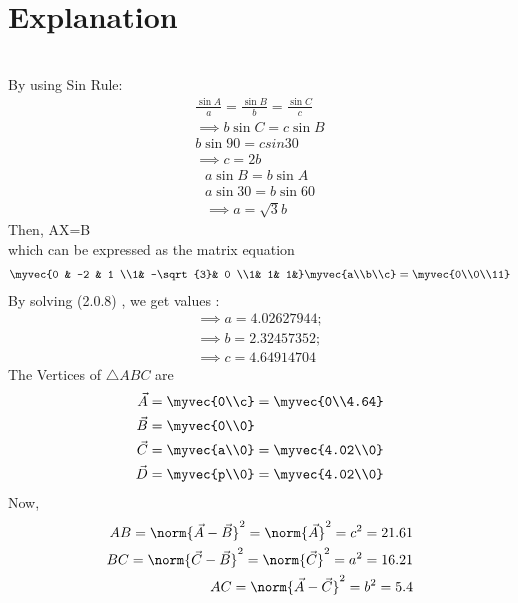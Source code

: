 \documentclass[journal,12pt,twocolumn]{IEEEtran}
\begin{document}
\section{Explanation}
\\
By using Sin Rule:
\begin{align}
\frac{\sin{A}}{a}=\frac{\sin{B}}{b}=\frac{\sin{C}}{c}
\\
\implies b\sin{C}=c\sin{B}
\\
b\sin{90}=csin{30}
\\
\implies c=2b
\end{align}
\begin{align}
a\sin{B}=b\sin{A}
\\
a\sin{30}=b\sin{60}
\\
\implies a=\sqrt{3}b
\end{align}
Then, AX=B
\\
which can be expressed as the matrix equation
\begin{align}
\myvec{0 & -2 & 1 \\1& -\sqrt{3}& 0 \\1& 1& 1&}\myvec{a\\b\\c} = \myvec{0\\0\\11}
\end{align}
By solving (2.0.8) , we get values :
\begin{align}
    \implies a=4.02627944;
    \\
    \implies b=2.32457352;
    \\
    \implies c=4.64914704
\end{align} 
The Vertices of $\triangle ABC$ are
\begin{align}
    \Vec{A}&=\myvec{0\\c}=\myvec{0\\4.64}\\\Vec{B}&=\myvec{0\\0}\\\Vec{C}&=\myvec{a\\0}=\myvec{4.02\\0}\\\Vec{D}&=\myvec{p\\0}=\myvec{4.02\\0}
\end{align}
Now,
\begin{align}
AB=\norm{\vec{A}-\vec{B}}^2 = \norm{\vec{A}}^2  = c^2 =21.61
\\
BC=\norm{\vec{C}-\vec{B}}^2 = \norm{\vec{C}}^2 =a^2=16.21
\\
AC=\norm{\vec{A}-\vec{C}}^2 = b^2=5.4
\end{align}
\end{document}
